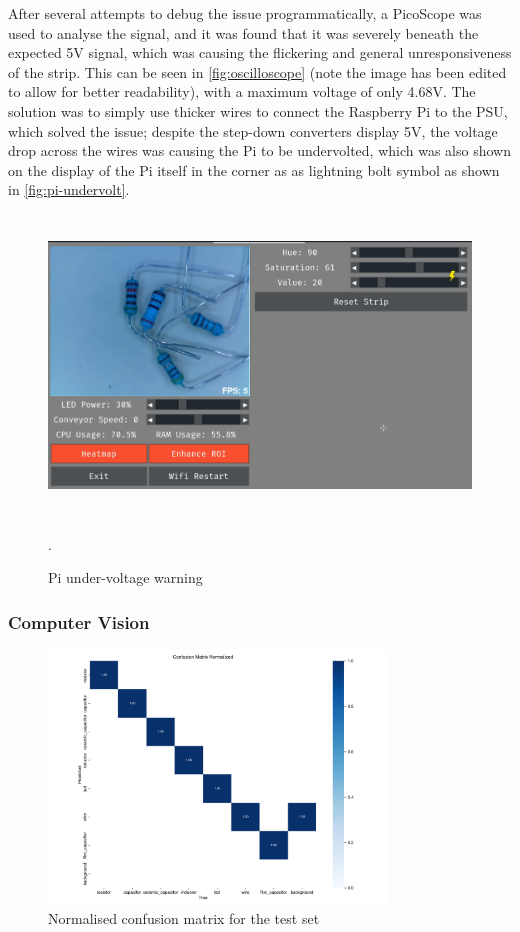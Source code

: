After several attempts to debug the issue programmatically, a PicoScope \cite{picoscope} was used to analyse the signal, and it was found that it was severely beneath the expected 5V signal, which was causing the flickering and general unresponsiveness of the strip. This can be seen in \autoref{fig:oscilloscope} (note the image has been edited to allow for better readability), with a maximum voltage of only 4.68V. The solution was to simply use thicker wires to connect the Raspberry Pi to the PSU, which solved the issue; despite the step-down converters display 5V, the voltage drop across the wires was causing the Pi to be undervolted, which was also shown on the display of the Pi itself in the corner as as lightning bolt symbol as shown in \autoref{fig:pi-undervolt}.
\begin{figure}[H]
    \centering
    \includegraphics[height=8cm]{imgs/software/undervolt.jpg}
    \caption{Pi under-voltage warning}
    \label{fig:pi-undervolt}.
  \end{figure}

\subsubsection{Computer Vision}

\begin{figure}[H]
    \centering
    \includegraphics[width=0.8\textwidth]{imgs/graphs/confusion_matrix_test.png}
    \caption{Normalised confusion matrix for the test set}
    \label{fig:confusion-matrix}
  \end{figure}

